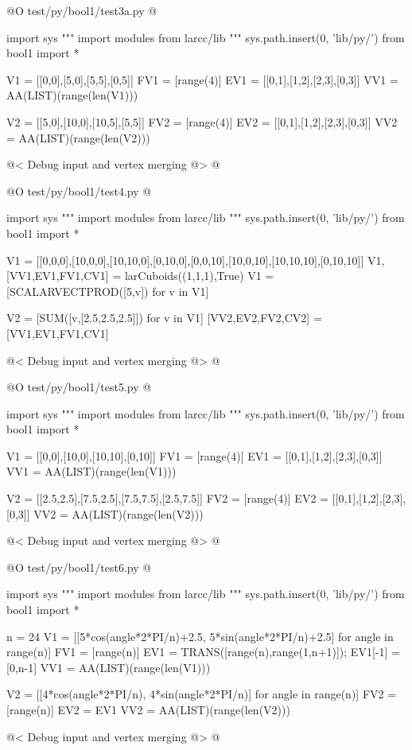 \documentclass[11pt,oneside]{article}	%
\begin{document}
@O test/py/bool1/test3a.py
@{
import sys
""" import modules from larcc/lib """
sys.path.insert(0, 'lib/py/')
from bool1 import *

V1 = [[0,0],[5,0],[5,5],[0,5]]
FV1 = [range(4)]
EV1 = [[0,1],[1,2],[2,3],[0,3]]
VV1 = AA(LIST)(range(len(V1)))

V2 = [[5,0],[10,0],[10,5],[5,5]]
FV2 = [range(4)]
EV2 = [[0,1],[1,2],[2,3],[0,3]]
VV2 = AA(LIST)(range(len(V2)))

@< Debug input and vertex merging @>
@}

@O test/py/bool1/test4.py
@{
import sys
""" import modules from larcc/lib """
sys.path.insert(0, 'lib/py/')
from bool1 import *

V1 = [[0,0,0],[10,0,0],[10,10,0],[0,10,0],[0,0,10],[10,0,10],[10,10,10],[0,10,10]]
V1,[VV1,EV1,FV1,CV1] = larCuboids((1,1,1),True)
V1 = [SCALARVECTPROD([5,v]) for v in V1]

V2 = [SUM([v,[2.5,2.5,2.5]]) for v in V1]
[VV2,EV2,FV2,CV2] = [VV1,EV1,FV1,CV1]

@< Debug input and vertex merging @>
@}

@O test/py/bool1/test5.py
@{
import sys
""" import modules from larcc/lib """
sys.path.insert(0, 'lib/py/')
from bool1 import *


V1 = [[0,0],[10,0],[10,10],[0,10]]
FV1 = [range(4)]
EV1 = [[0,1],[1,2],[2,3],[0,3]]
VV1 = AA(LIST)(range(len(V1)))

V2 = [[2.5,2.5],[7.5,2.5],[7.5,7.5],[2.5,7.5]]
FV2 = [range(4)]
EV2 = [[0,1],[1,2],[2,3],[0,3]]
VV2 = AA(LIST)(range(len(V2)))

@< Debug input and vertex merging @>
@}

@O test/py/bool1/test6.py
@{
import sys
""" import modules from larcc/lib """
sys.path.insert(0, 'lib/py/')
from bool1 import *


n = 24
V1 = [[5*cos(angle*2*PI/n)+2.5, 5*sin(angle*2*PI/n)+2.5] for angle in range(n)]
FV1 = [range(n)]
EV1 = TRANS([range(n),range(1,n+1)]); EV1[-1] = [0,n-1]
VV1 = AA(LIST)(range(len(V1)))

V2 = [[4*cos(angle*2*PI/n), 4*sin(angle*2*PI/n)] for angle in range(n)]
FV2 = [range(n)]
EV2 = EV1
VV2 = AA(LIST)(range(len(V2)))

@< Debug input and vertex merging @>
@}
\end{document}
